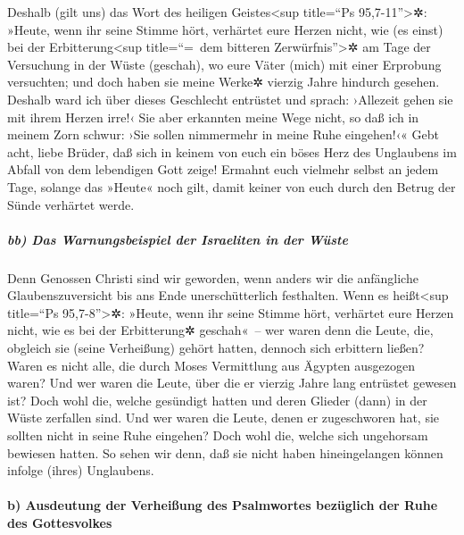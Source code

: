  Deshalb (gilt uns) das Wort des heiligen
Geistes\textless sup title=``Ps 95,7-11''\textgreater✲: »Heute, wenn ihr
seine Stimme hört,  verhärtet eure Herzen nicht, wie (es
einst) bei der Erbitterung\textless sup title=``=~dem bitteren
Zerwürfnis''\textgreater✲ am Tage der Versuchung in der Wüste (geschah),
 wo eure Väter (mich) mit einer Erprobung versuchten; und
doch haben sie meine Werke✲ vierzig Jahre hindurch gesehen.
 Deshalb ward ich über dieses Geschlecht entrüstet und
sprach: ›Allezeit gehen sie mit ihrem Herzen irre!‹ Sie aber erkannten
meine Wege nicht,  so daß ich in meinem Zorn schwur: ›Sie
sollen nimmermehr in meine Ruhe eingehen!‹«  Gebt acht,
liebe Brüder, daß sich in keinem von euch ein böses Herz des Unglaubens
im Abfall von dem lebendigen Gott zeige!  Ermahnt euch
vielmehr selbst an jedem Tage, solange das »Heute« noch gilt, damit
keiner von euch durch den Betrug der Sünde verhärtet werde.

\hypertarget{bb-das-warnungsbeispiel-der-israeliten-in-der-wuxfcste}{%
\subparagraph{bb) Das Warnungsbeispiel der Israeliten in der
Wüste}\label{bb-das-warnungsbeispiel-der-israeliten-in-der-wuxfcste}}

 Denn Genossen Christi sind wir geworden, wenn anders wir
die anfängliche Glaubenszuversicht bis ans Ende unerschütterlich
festhalten.  Wenn es heißt\textless sup title=``Ps
95,7-8''\textgreater✲: »Heute, wenn ihr seine Stimme hört, verhärtet
eure Herzen nicht, wie es bei der Erbitterung✲ geschah«~--
 wer waren denn die Leute, die, obgleich sie (seine
Verheißung) gehört hatten, dennoch sich erbittern ließen? Waren es nicht
alle, die durch Moses Vermittlung aus Ägypten ausgezogen waren?
 Und wer waren die Leute, über die er vierzig Jahre lang
entrüstet gewesen ist? Doch wohl die, welche gesündigt hatten und deren
Glieder (dann) in der Wüste zerfallen sind.  Und wer
waren die Leute, denen er zugeschworen hat, sie sollten nicht in seine
Ruhe eingehen? Doch wohl die, welche sich ungehorsam bewiesen hatten.
 So sehen wir denn, daß sie nicht haben hineingelangen
können infolge (ihres) Unglaubens.

\hypertarget{b-ausdeutung-der-verheiuxdfung-des-psalmwortes-bezuxfcglich-der-ruhe-des-gottesvolkes}{%
\paragraph{b) Ausdeutung der Verheißung des Psalmwortes bezüglich der
Ruhe des
Gottesvolkes}\label{b-ausdeutung-der-verheiuxdfung-des-psalmwortes-bezuxfcglich-der-ruhe-des-gottesvolkes}}


